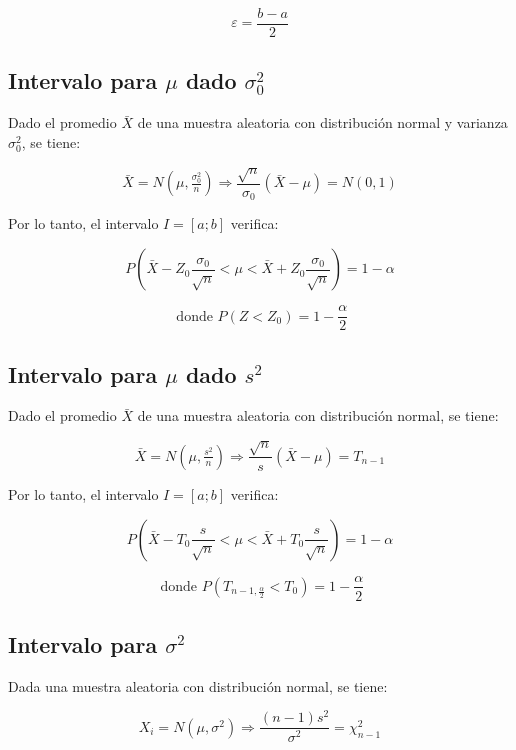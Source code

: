 \documentclass[a5paper,12pt,twoside]{book}
\begin{document}
$$ \varepsilon = \dfrac{b-a}{2} $$

\subsection{Intervalo para $\mu$ dado $\sigma_0^2$}

Dado el promedio $\bar{X}$ de una muestra aleatoria con distribución normal y varianza $\sigma_0^2$, se tiene:

$$ \bar{X} = N(\mu,\tfrac{\sigma_0^2}{n}) \Rightarrow \dfrac{\sqrt{n}}{\sigma_0} (\bar{X}-\mu) = N(0,1) $$

Por lo tanto, el intervalo $I=[a;b]$ verifica:

\begin{equation}
P \left( \bar{X} - Z_0 \dfrac{\sigma_0}{\sqrt{n}} < \mu < \bar{X} + Z_0 \dfrac{\sigma_0}{\sqrt{n}} \right) = 1 - \alpha
\end{equation}

$$ \text{ donde } P(Z<Z_0)=1-\dfrac{\alpha}{2} $$

\subsection{Intervalo para $\mu$ dado $s^2$}

Dado el promedio $\bar{X}$ de una muestra aleatoria con distribución normal, se tiene:

$$ \bar{X} = N(\mu,\tfrac{s^2}{n}) \Rightarrow \dfrac{\sqrt{n}}{s} (\bar{X}-\mu) = T_{n-1} $$

Por lo tanto, el intervalo $I=[a;b]$ verifica:

\begin{equation}
P \left( \bar{X} - T_0 \dfrac{s}{\sqrt{n}} < \mu < \bar{X} + T_0 \dfrac{s}{\sqrt{n}} \right) = 1 - \alpha
\end{equation}

$$ \text{ donde } P(T_{n-1,\tfrac{\alpha}{2}}<T_0)=1-\dfrac{\alpha}{2} $$

\subsection{Intervalo para $\sigma^2$}

Dada una muestra aleatoria con distribución normal, se tiene:

$$ X_i = N(\mu,\sigma^2) \Rightarrow \dfrac{(n-1)s^2}{\sigma^2} = \chi_{n-1}^2 $$

\end{document}
